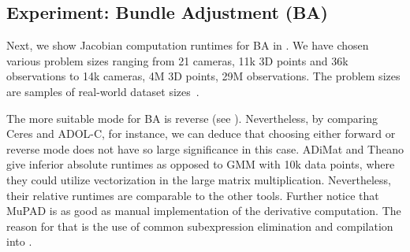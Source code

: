\documentclass[suppldata]{article}
\begin{document}
\ifmobile\clearpage\fi

\subsection*{Experiment: Bundle Adjustment (BA)}

Next, we show Jacobian computation runtimes for BA in  . We have chosen various problem sizes ranging from 21 cameras, 11k 3D points and 36k observations to 14k cameras, 4M 3D points, 29M observations. The problem sizes are samples of real-world dataset sizes~\cite{Agarwal10ba}. 

The more suitable mode for BA is reverse (see ). Nevertheless, by comparing Ceres and ADOL-C, for instance, we can deduce that choosing either forward or reverse mode does not have so large significance in this case. ADiMat and Theano give inferior absolute runtimes as opposed to GMM with 10k data points, where they could utilize vectorization in the large matrix multiplication. Nevertheless, their relative runtimes are comparable to the other tools. Further notice that MuPAD is as good as manual implementation of the derivative computation. The reason for that is the use of common subexpression elimination and compilation into \Cpp{}.
\end{document}

